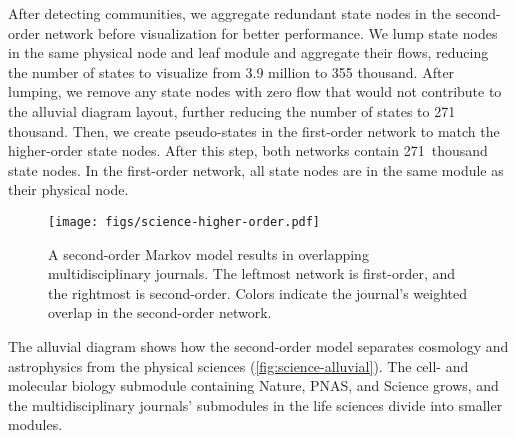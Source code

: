 \documentclass[aps,rmp,floats,floatfix,twocolumn,superscriptaddress,final]{revtex4-2}
\begin{document}
After detecting communities, we aggregate redundant state nodes in the second-order network before visualization for better performance.
We lump state nodes in the same physical node and leaf module and aggregate their flows,
reducing the number of states to visualize from 3.9 million to 355 thousand.
After lumping, we remove any state nodes with zero flow that would not contribute to the alluvial diagram layout, further reducing the number of states to 271 thousand.
Then, we create pseudo-states in the first-order network to match the higher-order state nodes.
After this step, both networks contain 271~thousand state nodes. In the first-order network, all state nodes are in the same module as their physical node.

\begin{figure}[htp!]
    \centering
    \texttt{[image: figs/science-higher-order.pdf]}
    \caption{A second-order Markov model results in overlapping multidisciplinary journals.
    The leftmost network is first-order, and the rightmost is second-order.
    Colors indicate the journal's weighted overlap in the second-order network.}
    \label{fig:science-higher-order}
\end{figure}
%
The alluvial diagram shows how the second-order model separates cosmology and astrophysics from the physical sciences (\cref{fig:science-alluvial}).
The cell- and molecular biology submodule containing Nature, PNAS, and Science grows,
and the multidisciplinary journals' submodules in the life sciences divide into smaller modules.
\end{document}
